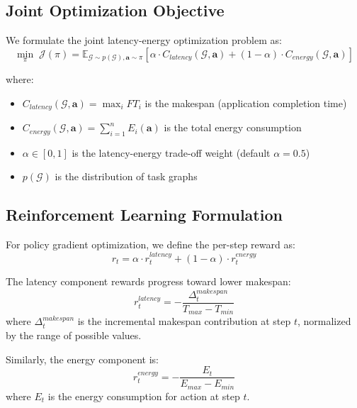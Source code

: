 \documentclass[journal,twoside]{IEEEtran}
\newcommand{\E}{\mathbb{E}}
\begin{document}
\subsection{Joint Optimization Objective}

We formulate the joint latency-energy optimization problem as:
\begin{equation}
\min_{\pi} \; \mathcal{J}(\pi) = \E_{\mathcal{G} \sim p(\mathcal{G}), \mathbf{a} \sim \pi}\left[ \alpha \cdot C_{latency}(\mathcal{G}, \mathbf{a}) + (1-\alpha) \cdot C_{energy}(\mathcal{G}, \mathbf{a}) \right]
\label{eq:objective}
\end{equation}

where:
\begin{itemize}
    \item $C_{latency}(\mathcal{G}, \mathbf{a}) = \max_i FT_i$ is the makespan (application completion time)
    \item $C_{energy}(\mathcal{G}, \mathbf{a}) = \sum_{i=1}^{n} E_i(\mathbf{a})$ is the total energy consumption
    \item $\alpha \in [0, 1]$ is the latency-energy trade-off weight (default $\alpha = 0.5$)
    \item $p(\mathcal{G})$ is the distribution of task graphs
\end{itemize}

\subsection{Reinforcement Learning Formulation}

For policy gradient optimization, we define the per-step reward as:
\begin{equation}
r_t = \alpha \cdot r_t^{latency} + (1-\alpha) \cdot r_t^{energy}
\label{eq:reward}
\end{equation}

The latency component rewards progress toward lower makespan:
\begin{equation}
r_t^{latency} = -\frac{\Delta_t^{makespan}}{T_{max} - T_{min}}
\end{equation}
where $\Delta_t^{makespan}$ is the incremental makespan contribution at step $t$, normalized by the range of possible values.

Similarly, the energy component is:
\begin{equation}
r_t^{energy} = -\frac{E_t}{E_{max} - E_{min}}
\end{equation}
where $E_t$ is the energy consumption for action at step $t$.
\end{document}

